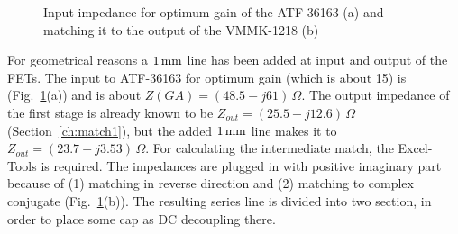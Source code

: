 \begin{figure}
  \centering
  \caption{Input impedance for optimum gain of the ATF-36163 (a) and
    matching it to the output of the VMMK-1218 (b)}
  \label{fig:atf36163_input}
\end{figure}

For geometrical reasons a $1\,\mathrm{mm}$ line has been added at input
and output of the FETs.  The input to ATF-36163 for optimum gain
(which is about 15) is (Fig.~\ref{fig:atf36163_input}(a)) and is about
$Z(GA)=(48.5-j61)\,\Omega$.  The output impedance of the first stage
is already known to be $Z_{out}=(25.5-j12.6)\,\Omega$
(Section~\ref{ch:match1}), but the added $1\,\mathrm{mm}$ line makes it
to $Z_{out}=(23.7-j3.53)\,\Omega$. For calculating the intermediate
match, the Excel-Tools is required. The impedances are plugged in with
positive imaginary part because of (1) matching in reverse direction
and (2) matching to complex conjugate
(Fig.~\ref{fig:atf36163_input}(b)). The resulting series line is
divided into two section, in order to place some cap as DC decoupling
there.

